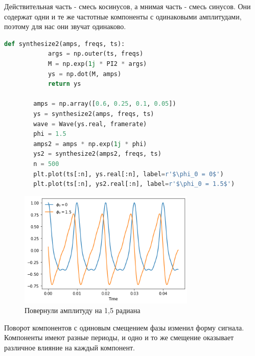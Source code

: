 \documentclass[a4paper, 12pt]{report}
\begin{document}
	Действительная часть - смесь косинусов, а мнимая часть - смесь синусов. Они содержат одни и те же частотные компоненты с одинаковыми амплитудами, поэтому для нас они звучат одинаково.
	\begin{lstlisting}[language=Python,caption=Применим функцию с матричным умножением]
		def synthesize2(amps, freqs, ts):
			args = np.outer(ts, freqs)
			M = np.exp(1j * PI2 * args)
			ys = np.dot(M, amps)
			return ys
	
		amps = np.array([0.6, 0.25, 0.1, 0.05])
		ys = synthesize2(amps, freqs, ts)
		wave = Wave(ys.real, framerate)
		phi = 1.5
		amps2 = amps * np.exp(1j * phi)
		ys2 = synthesize2(amps2, freqs, ts)
		n = 500
		plt.plot(ts[:n], ys.real[:n], label=r'$\phi_0 = 0$')
		plt.plot(ts[:n], ys2.real[:n], label=r'$\phi_0 = 1.5$')
	\end{lstlisting}
	\begin{figure}[H]
		\centering
		\includegraphics[width=0.75\textwidth]{task2.png}
		\caption{Повернули амплитуду на 1,5 радиана}
		\label{fig:task2}
	\end{figure}
	Поворот компонентов с одиновым смещением фазы изменил форму сигнала. Компоненты имеют разные периоды, и одно и то же смещение оказывает различное влияние на каждый компонент.
\end{document}
